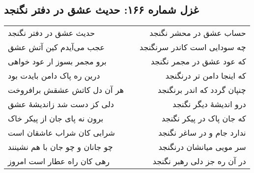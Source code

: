 \begin{center}
\section*{غزل شماره ۱۶۶: حدیث عشق در دفتر نگنجد}
\label{sec:166}
\begin{longtable}{l p{0.5cm} r}
حدیث عشق در دفتر نگنجد
&&
حساب عشق در محشر نگنجد
\\
عجب می‌آیدم کین آتش عشق
&&
چه سودایی است کاندر سرنگنجد
\\
برو مجمر بسوز ار عود خواهی
&&
که عود عشق در مجمر نگنجد
\\
درین ره پاک دامن بایدت بود
&&
که اینجا دامن تر درنگنجد
\\
هر آن دل کاتش عشقش برافروخت
&&
چنپان گردد که اندر برنگنجد
\\
دلی کز دست شد زاندیشهٔ عشق
&&
درو اندیشهٔ دیگر نگنجد
\\
برون نه پای جان از پیکر خاک
&&
که جان پاک در پیکر نگنجد
\\
شرابی کان شراب عاشقان است
&&
ندارد جام و در ساغر نگنجد
\\
چو جانان و چو جان با هم نشینند
&&
سر مویی میانشان درنگنجد
\\
رهی کان راه عطار است امروز
&&
در آن ره جز دلی رهبر نگنجد
\\
\end{longtable}
\end{center}
